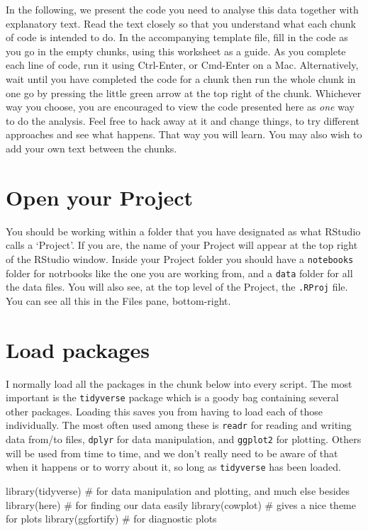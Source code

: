 \documentclass[
  letterpaper,
  DIV=11,
  numbers=noendperiod]{scrreprt}
\newenvironment{Shaded}{\begin{snugshade}}{\end{snugshade}}
\newcommand{\CommentTok}[1]{\textcolor[rgb]{0.37,0.37,0.37}{#1}}
\newcommand{\FunctionTok}[1]{\textcolor[rgb]{0.28,0.35,0.67}{#1}}
\newcommand{\NormalTok}[1]{\textcolor[rgb]{0.00,0.23,0.31}{#1}}
\begin{document}
In the following, we present the code you need to analyse this data
together with explanatory text. Read the text closely so that you
understand what each chunk of code is intended to do. In the
accompanying template file, fill in the code as you go in the empty
chunks, using this worksheet as a guide. As you complete each line of
code, run it using Ctrl-Enter, or Cmd-Enter on a Mac. Alternatively,
wait until you have completed the code for a chunk then run the whole
chunk in one go by pressing the little green arrow at the top right of
the chunk. Whichever way you choose, you are encouraged to view the code
presented here as \emph{one} way to do the analysis. Feel free to hack
away at it and change things, to try different approaches and see what
happens. That way you will learn. You may also wish to add your own text
between the chunks.

\section{Open your Project}\label{open-your-project}

You should be working within a folder that you have designated as what
RStudio calls a `Project'. If you are, the name of your Project will
appear at the top right of the RStudio window. Inside your Project
folder you should have a \texttt{notebooks} folder for notrbooks like
the one you are working from, and a \texttt{data} folder for all the
data files. You will also see, at the top level of the Project, the
\texttt{.RProj} file. You can see all this in the Files pane,
bottom-right.

\section{Load packages}\label{load-packages-3}

I normally load all the packages in the chunk below into every script.
The most important is the \texttt{tidyverse} package which is a goody
bag containing several other packages. Loading this saves you from
having to load each of those individually. The most often used among
these is \texttt{readr} for reading and writing data from/to files,
\texttt{dplyr} for data manipulation, and \texttt{ggplot2} for plotting.
Others will be used from time to time, and we don't really need to be
aware of that when it happens or to worry about it, so long as
\texttt{tidyverse} has been loaded.

\begin{Shaded}
\begin{Highlighting}[]
\FunctionTok{library}\NormalTok{(tidyverse)  }\CommentTok{\# for data manipulation and plotting, and much else besides}
\FunctionTok{library}\NormalTok{(here) }\CommentTok{\# for finding our data easily}
\FunctionTok{library}\NormalTok{(cowplot) }\CommentTok{\# gives a nice theme for plots}
\FunctionTok{library}\NormalTok{(ggfortify) }\CommentTok{\# for diagnostic plots}
\end{Highlighting}
\end{Shaded}
\end{document}
